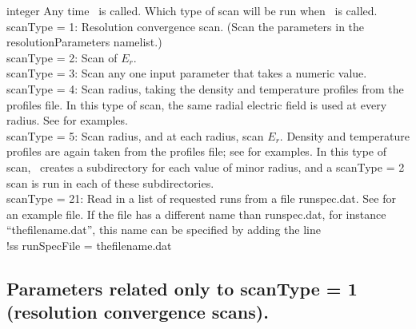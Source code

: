 \myhrule

{integer}
{Any time \sfincsScan~is called.}
{Which type of scan will be run when \sfincsScan~is called. \\

{\ttfamily scanType} = 1:  Resolution convergence scan. (Scan the parameters in the resolutionParameters namelist.)\\

{\ttfamily scanType} = 2:  Scan of $E_r$.\\

{\ttfamily scanType} = 3:  Scan any one input parameter that takes a numeric value.\\

{\ttfamily scanType} = 4:  Scan radius, taking the density and temperature profiles from the {\ttfamily profiles} file.
In this type of scan, the same radial electric field is used at every radius.
See  for examples.\\

{\ttfamily scanType} = 5:  Scan radius, and at each radius, scan $E_r$.  Density and temperature profiles are again
 taken from the {\ttfamily profiles} file; see  for examples.
In this type of scan, \sfincsScan~creates a subdirectory for each value of minor radius, and a
{\ttfamily scanType} = 2 scan is run in each of these subdirectories.
\\

{\ttfamily scanType} = 21: Read in a list of requested runs from a
file {\ttfamily runspec.dat}. See
 for an example file. If the
file has a different name than {\ttfamily runspec.dat}, for instance
``thefilename.dat'', this name can be
specified by adding the line\\
{\ttfamily
!ss runSpecFile = thefilename.dat\\
}
}



\subsection{Parameters related only to {\ttfamily scanType} = 1 (resolution convergence scans).}

